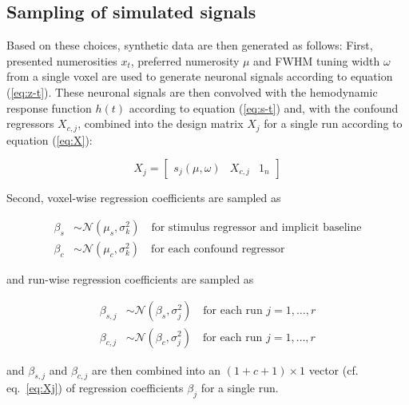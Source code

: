 \documentclass[a4paper,12pt]{article}
\begin{document}
\subsection{Sampling of simulated signals}

Based on these choices, synthetic data are then generated as follows: First, presented numerosities $x_t$, preferred numerosity $\mu$ and FWHM tuning width $\omega$ from a single voxel are used to generate neuronal signals according to equation (\ref{eq:z-t}). These neuronal signals are then convolved with the hemodynamic response function $h(t)$ according to equation (\ref{eq:s-t}) and, with the confound regressors $X_{c,j}$, combined into the design matrix $X_j$ for a single run according to equation (\ref{eq:X}):

\begin{equation} \label{eq:Xj}
X_j = \left[ \begin{matrix} s_j(\mu,\omega) & X_{c,j} & 1_n \end{matrix} \right]
\end{equation}

Second, voxel-wise regression coefficients are sampled as

\vspace{-0.5em}
\begin{equation} \label{eq:b}
\begin{split}
\beta_s &\sim \mathcal{N}(\mu_s, \sigma_k^2) \quad \text{for stimulus regressor and implicit baseline} \\
\beta_c &\sim \mathcal{N}(\mu_c, \sigma_k^2) \quad \text{for each confound regressor}
\end{split}
\end{equation}

and run-wise regression coefficients are sampled as

\vspace{-0.5em}
\begin{equation} \label{eq:bj}
\begin{split}
\beta_{s,j} &\sim \mathcal{N}(\beta_s, \sigma_j^2) \quad \text{for each run } j = 1,\ldots,r \\
\beta_{c,j} &\sim \mathcal{N}(\beta_c, \sigma_j^2) \quad \text{for each run } j = 1,\ldots,r
\end{split}
\end{equation}

and $\beta_{s,j}$ and $\beta_{c,j}$ are then combined into an $(1+c+1) \times 1$ vector (cf. eq.~\ref{eq:Xj}) of regression coefficients $\beta_j$ for a single run.
\end{document}
